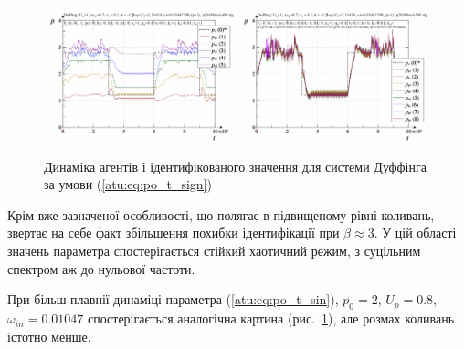 \begin{figure}[ht!]
\begin{center}
  \includegraphics[width=0.49\textwidth]{p/cha/duff/duff_id-p_t_pi_ql3rlWvnAAW_sign.png}
  \hfill
  \includegraphics[width=0.49\textwidth]{p/cha/duff/duff_id-p_t_p_ql3rlWvnAAW_sign.png}
\end{center}
\caption{Динаміка агентів і ідентифікованого значення для системи Дуффінга за умови (\ref{atu:eq:po_t_sign})}
\label{atu:f:duff_id_sign}
\end{figure}

Крім вже зазначеної особливості, що полягає в підвищеному рівні
коливань, звертає на себе факт збільшення похибки ідентифікації
при
$ \beta \approx 3 $. У цій області значень параметра спостерігається
стійкий хаотичний режим, з суцільним спектром аж до нульової частоти.

При більш плавнії динаміці параметра (\ref{atu:eq:po_t_sin}),
$ p_0 = 2 $,
$ U_p = 0.8 $,
$ \omega_{in} = 0.01047 $ спостерігається аналогічна картина
(рис.~\ref{atu:f:duff_id_sign}), але розмах коливань істотно менше.

